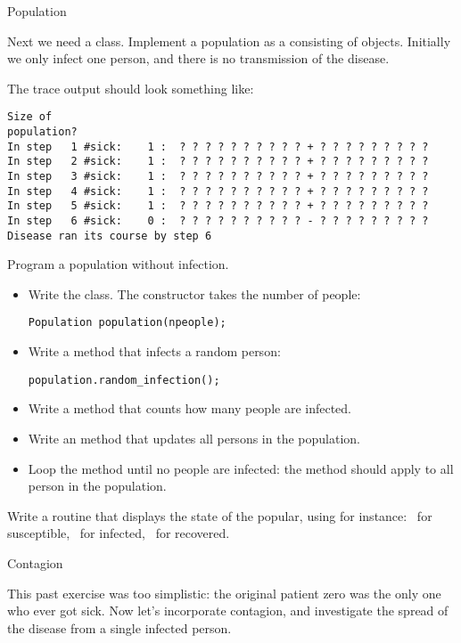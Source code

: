  {Population}

\prerequisite{\ref{ch:array}}

Next we need a  class. Implement a population as a 
consisting of  objects. Initially we only infect one person, and there
is no transmission of the disease.

The trace output should look something like:
\begin{verbatim}
Size of
population?
In step   1 #sick:    1 :  ? ? ? ? ? ? ? ? ? ? + ? ? ? ? ? ? ? ? ?
In step   2 #sick:    1 :  ? ? ? ? ? ? ? ? ? ? + ? ? ? ? ? ? ? ? ?
In step   3 #sick:    1 :  ? ? ? ? ? ? ? ? ? ? + ? ? ? ? ? ? ? ? ?
In step   4 #sick:    1 :  ? ? ? ? ? ? ? ? ? ? + ? ? ? ? ? ? ? ? ?
In step   5 #sick:    1 :  ? ? ? ? ? ? ? ? ? ? + ? ? ? ? ? ? ? ? ?
In step   6 #sick:    0 :  ? ? ? ? ? ? ? ? ? ? - ? ? ? ? ? ? ? ? ?
Disease ran its course by step 6
\end{verbatim}

\begin{exercise}
  \label{ex:infect:notransfer}
  Program a population without infection.
  \begin{itemize}
  \item Write the  class. The constructor takes the number of people:
\begin{lstlisting}
Population population(npeople);  
\end{lstlisting}
  \item Write a method that infects a random person:
\begin{lstlisting}
population.random_infection();
\end{lstlisting}
  \item Write a method  that counts how many people are infected.
  \item Write an  method that updates all persons in the population.
  \item Loop the  method until no people are infected: the
     method should apply  to
    all person in the population.
  \end{itemize}
\item Write a routine that displays the state of the popular, using
  for instance: ~for susceptible, \n{+}~for infected, \n{-}~for recovered.
\end{exercise}

 {Contagion}

This past exercise was too simplistic: the original patient zero was
the only one who ever got sick.
Now let's incorporate contagion, and investigate the spread of the disease
from a single infected person.

